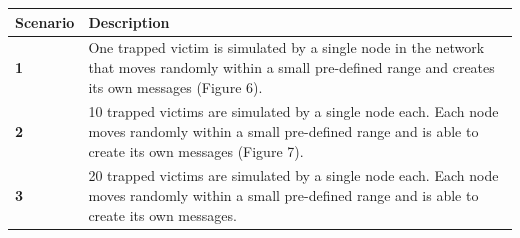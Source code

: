 \documentclass{article}
\begin{document}
\begin{center}
\vspace{6px}
\begin{tabular}{|l|p{13cm}|}
\hline
\textbf{Scenario} & \textbf{Description} \\ \hline
\textbf{1} & One trapped victim is simulated by a single node in the network that moves randomly within a small pre-defined range and creates its own messages (Figure 6). \\ \hline
\textbf{2} & 10 trapped victims are simulated by a single node each. Each node moves randomly within a small pre-defined range and is able to create its own messages (Figure 7). \\ \hline
\textbf{3} & 20 trapped victims are simulated by a single node each. Each node moves randomly within a small pre-defined range and is able to create its own messages. \\ \hline
\end{tabular}
\end{center}
\end{document}
